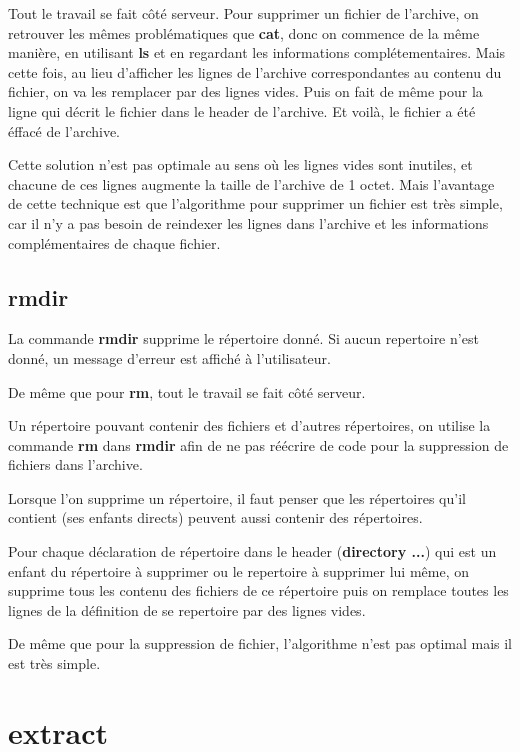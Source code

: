 \documentclass[titlepage]{article}
\begin{document}
	Tout le travail se fait côté serveur. Pour supprimer un fichier de l'archive, on retrouver les mêmes problématiques que \textbf{cat}, donc on commence de la même manière, en utilisant \textbf{ls} et en regardant les informations complétementaires. Mais cette fois, au lieu d'afficher les lignes de l'archive correspondantes au contenu du fichier, on va les remplacer par des lignes vides. Puis on fait de même pour la ligne qui décrit le fichier dans le header de l'archive. Et voilà, le fichier a été éffacé de l'archive.

	Cette solution n'est pas optimale au sens où les lignes vides sont inutiles, et chacune de ces lignes augmente la taille de l'archive de 1 octet. Mais l'avantage de cette technique est que l'algorithme pour supprimer un fichier est très simple, car il n'y a pas besoin de reindexer les lignes dans l'archive et les informations complémentaires de chaque fichier.

	\subsection{rmdir}

	La commande \textbf{rmdir} supprime le répertoire donné. Si aucun repertoire n'est donné, un message d'erreur est affiché à l'utilisateur.

	De même que pour \textbf{rm}, tout le travail se fait côté serveur.

	Un répertoire pouvant contenir des fichiers et d'autres répertoires, on utilise la commande \textbf{rm} dans \textbf{rmdir} afin de ne pas réécrire de code pour la suppression de fichiers dans l'archive.

	Lorsque l'on supprime un répertoire, il faut penser que les répertoires qu'il contient (ses enfants directs) peuvent aussi contenir des répertoires. 

	Pour chaque déclaration de répertoire dans le header (\textbf{directory ...}) qui est un enfant du répertoire à supprimer ou le repertoire à supprimer lui même, on supprime tous les contenu des fichiers de ce répertoire puis on remplace toutes les lignes de la définition de se repertoire par des lignes vides.

	De même que pour la suppression de fichier, l'algorithme n'est pas optimal mais il est très simple.  

	\section{extract}
\end{document}

